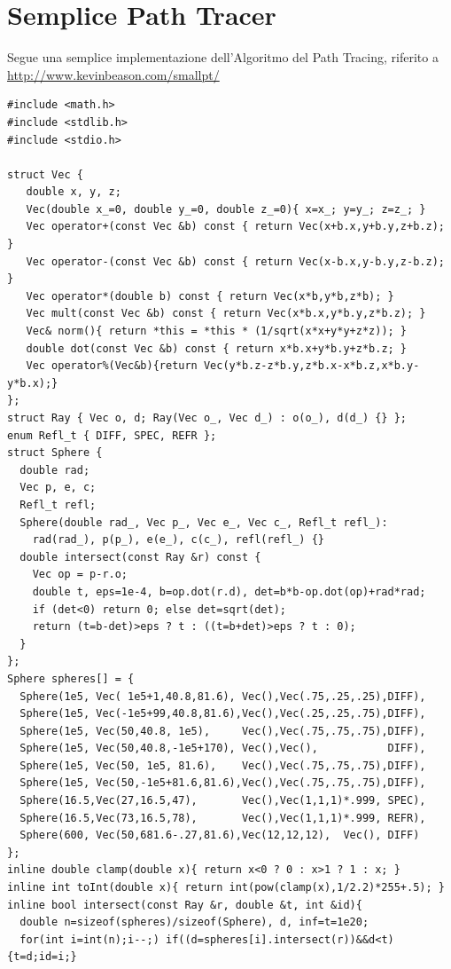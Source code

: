 \section{Semplice Path Tracer}\label{appendixD:pathTracer}
Segue una semplice implementazione dell'Algoritmo del Path Tracing, riferito a 
\href{http://www.kevinbeason.com/smallpt/}{http://www.kevinbeason.com/smallpt/}
\begin{verbatim}
#include <math.h>   
#include <stdlib.h> 
#include <stdio.h>  

struct Vec {        
   double x, y, z;                  
   Vec(double x_=0, double y_=0, double z_=0){ x=x_; y=y_; z=z_; } 
   Vec operator+(const Vec &b) const { return Vec(x+b.x,y+b.y,z+b.z); } 
   Vec operator-(const Vec &b) const { return Vec(x-b.x,y-b.y,z-b.z); } 
   Vec operator*(double b) const { return Vec(x*b,y*b,z*b); } 
   Vec mult(const Vec &b) const { return Vec(x*b.x,y*b.y,z*b.z); } 
   Vec& norm(){ return *this = *this * (1/sqrt(x*x+y*y+z*z)); } 
   double dot(const Vec &b) const { return x*b.x+y*b.y+z*b.z; } 
   Vec operator%(Vec&b){return Vec(y*b.z-z*b.y,z*b.x-x*b.z,x*b.y-y*b.x);} 
}; 
struct Ray { Vec o, d; Ray(Vec o_, Vec d_) : o(o_), d(d_) {} }; 
enum Refl_t { DIFF, SPEC, REFR };  
struct Sphere { 
  double rad;
  Vec p, e, c;
  Refl_t refl;      
  Sphere(double rad_, Vec p_, Vec e_, Vec c_, Refl_t refl_): 
    rad(rad_), p(p_), e(e_), c(c_), refl(refl_) {} 
  double intersect(const Ray &r) const { 
    Vec op = p-r.o; 
    double t, eps=1e-4, b=op.dot(r.d), det=b*b-op.dot(op)+rad*rad; 
    if (det<0) return 0; else det=sqrt(det); 
    return (t=b-det)>eps ? t : ((t=b+det)>eps ? t : 0); 
  } 
}; 
Sphere spheres[] = {
  Sphere(1e5, Vec( 1e5+1,40.8,81.6), Vec(),Vec(.75,.25,.25),DIFF),
  Sphere(1e5, Vec(-1e5+99,40.8,81.6),Vec(),Vec(.25,.25,.75),DIFF),
  Sphere(1e5, Vec(50,40.8, 1e5),     Vec(),Vec(.75,.75,.75),DIFF),
  Sphere(1e5, Vec(50,40.8,-1e5+170), Vec(),Vec(),           DIFF),
  Sphere(1e5, Vec(50, 1e5, 81.6),    Vec(),Vec(.75,.75,.75),DIFF),
  Sphere(1e5, Vec(50,-1e5+81.6,81.6),Vec(),Vec(.75,.75,.75),DIFF),
  Sphere(16.5,Vec(27,16.5,47),       Vec(),Vec(1,1,1)*.999, SPEC),
  Sphere(16.5,Vec(73,16.5,78),       Vec(),Vec(1,1,1)*.999, REFR),
  Sphere(600, Vec(50,681.6-.27,81.6),Vec(12,12,12),  Vec(), DIFF) 
}; 
inline double clamp(double x){ return x<0 ? 0 : x>1 ? 1 : x; } 
inline int toInt(double x){ return int(pow(clamp(x),1/2.2)*255+.5); } 
inline bool intersect(const Ray &r, double &t, int &id){ 
  double n=sizeof(spheres)/sizeof(Sphere), d, inf=t=1e20; 
  for(int i=int(n);i--;) if((d=spheres[i].intersect(r))&&d<t){t=d;id=i;} 

\end{verbatim}
